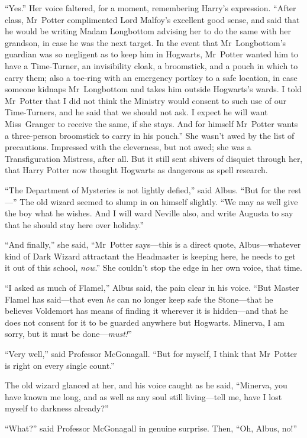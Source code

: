 “Yes.” Her voice faltered, for a moment, remembering Harry’s expression. “After class, Mr~Potter complimented Lord Malfoy’s excellent good sense, and said that he would be writing Madam Longbottom advising her to do the same with her grandson, in case he was the next target. In the event that Mr~Longbottom’s guardian was so negligent as to keep him in Hogwarts, Mr~Potter wanted him to have a Time-Turner, an invisibility cloak, a broomstick, and a pouch in which to carry them; also a toe-ring with an emergency portkey to a safe location, in case someone kidnaps Mr~Longbottom and takes him outside Hogwarts’s wards. I told Mr~Potter that I did not think the Ministry would consent to such use of our Time-Turners, and he said that we should not ask. I expect he will want Miss~Granger to receive the same, if she stays. And for himself Mr~Potter wants a three-person broomstick to carry in his pouch.” She wasn’t awed by the list of precautions. Impressed with the cleverness, but not awed; she was a Transfiguration Mistress, after all. But it still sent shivers of disquiet through her, that Harry Potter now thought Hogwarts as dangerous as spell research.

“The Department of Mysteries is not lightly defied,” said Albus. “But for the rest—” The old wizard seemed to slump in on himself slightly. “We may as well give the boy what he wishes. And I will ward Neville also, and write Augusta to say that he should stay here over holiday.”

“And finally,” she said, “Mr~Potter says—this is a direct quote, Albus—whatever kind of Dark Wizard attractant the Headmaster is keeping here, he needs to get it out of this school, \emph{now}.” She couldn’t stop the edge in her own voice, that time.

“I asked as much of Flamel,” Albus said, the pain clear in his voice. “But Master Flamel has said—that even \emph{he} can no longer keep safe the Stone—that he believes Voldemort has means of finding it wherever it is hidden—and that he does not consent for it to be guarded anywhere but Hogwarts. Minerva, I am sorry, but it must be done—\emph{must!}”

“Very well,” said Professor McGonagall. “But for myself, I think that Mr~Potter is right on every single count.”

The old wizard glanced at her, and his voice caught as he said, “Minerva, you have known me long, and as well as any soul still living—tell me, have I lost myself to darkness already?”

“What?” said Professor McGonagall in genuine surprise. Then, “Oh, Albus, no!”

